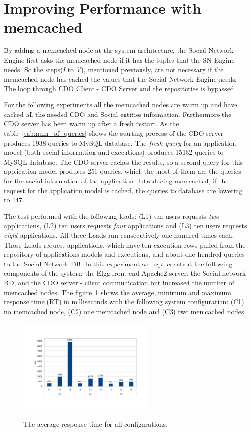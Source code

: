 \section{Improving Performance with memcached}
\label{sec:eval_memcache}
By adding a memcached node at the system architecture, the Social Network Engine first asks the memcached node if it has the tuples that the SN Engine needs. So the steps(\emph{I} to \emph{V}), mentioned previously, are not necessary if the memcached node has cached the values that the Social Network Engine needs. The loop through CDO CIient - CDO Server and the repositories is bypassed. 

For the following experiments all the memcached nodes are warm up and have cached all the needed CDO and Social entities information. Furthermore the CDO server has been warm up after a fresh restart. As the table~\ref{tab:num_of_queries} shows
the starting process of the CDO server produces 1938 queries to MySQL database. The \emph{fresh query} for an application model (both social information and executions) produces 15182 queries to MySQL database. The CDO server caches the results, so a second query for this application model produces 251 queries, which the most of them are the queries for the social information of the application. Introducing memcached, if the request for the application model is cached, the queries to database are lowering to 147.  

The test performed with the following loads: (L1) ten users requests \emph{two} applications, (L2) ten users requests \emph{four} applications and (L3) ten users requests \emph{eight} applications. All three Loads run consecutively one hundred times each. Those Loads request applications, which have ten execution rows pulled from the repository of applications models and executions, and about one hundred queries to the Social Network DB. In this experiment we kept constant the following components of the system: the Elgg front-end Apache2 server, the Social network BD, and the CDO server - client communication but increased the number of memcached nodes.
The figure~\ref{fig:rtavg} shows the  average, minimum and maximum response time (RT) in milliseconds with the following system configuration: (C1) no memcached node, (C2) one memcached node and (C3) two memcached nodes.

\begin{figure}[h]
	\caption{The average response time for all configurations.}
	\includegraphics[width=0.6\textwidth,natwidth=200,natheight=150]{./fig/RTavg.pdf}
	\centering
	\label{fig:rtavg}
\end{figure}

